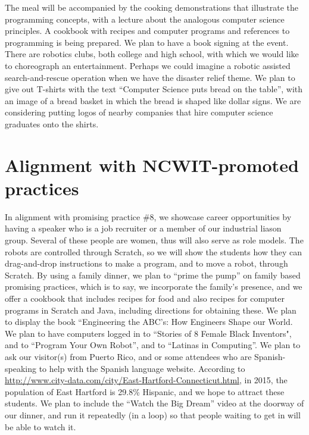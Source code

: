 \documentclass[]{article}
\begin{document}
	The meal will be accompanied by the cooking demonstrations that illustrate the programming concepts, with a lecture about the 
	analogous computer science principles. 
	A cookbook with recipes and computer programs and references to programming is being prepared. We plan to have a book signing 
	at the event.
	There are robotics clubs, both college and high school, with which we would like to choreograph an entertainment. Perhaps we could 
	imagine a robotic assisted search-and-rescue operation when we have the disaster relief theme. %
	We plan to give out T-shirts with the text ``Computer Science puts bread on the table'', with an image of a bread basket in which 
	the bread is shaped like dollar signs.
	We are considering putting logos of nearby companies that
	hire computer science graduates onto the shirts.%
	
	
	\section{Alignment with NCWIT-promoted practices}
	In alignment with promising practice \#8, we showcase career opportunities by having a speaker who is a job recruiter or a member 
	of our industrial liason group. Several of these people are women, thus will also serve as role models. The robots are controlled 
	through Scratch, so we will show the students how they can drag-and-drop instructions to make a program, and to move a robot, 
	through Scratch. 
	By using a family dinner, we plan to ``prime the pump'' on family based promising practices, which is to say, we incorporate the 
	family's presence, and we offer a cookbook that includes recipes for food and also recipes for computer programs in Scratch and 
	Java, including directions for obtaining these. 
	We plan to display the book ``Engineering the ABC's: How Engineers Shape our World.
	We plan to have computers logged in to  ``Stories of 8 Female Black Inventors", and to ``Program Your Own Robot'', and to 
	``Latinas in Computing''. We plan to ask our visitor(s) from Puerto Rico, and or some attendees who are Spanish-speaking to help with the Spanish language website. According to \url{http://www.city-data.com/city/East-Hartford-Connecticut.html}, in 2015, the population of East Hartford is 29.8\% Hispanic, and we hope to attract these students.
	We plan to include the ``Watch the Big Dream'' video at the doorway of our dinner, and run it repeatedly (in a loop) so that people
	waiting to get in will be able to watch it.
	
\end{document}
